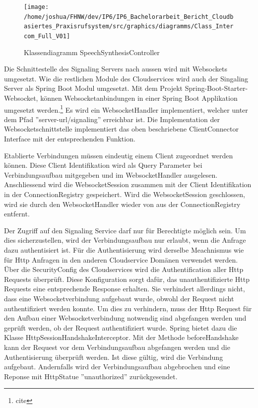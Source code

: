 \clearpage

%
%

\begin{figure}[h]
    \centering
    \begin{minipage}[b]{1\textwidth}
        \texttt{[image: /home/joshua/FHNW/dev/IP6/IP6\_Bachelorarbeit\_Bericht\_Cloudbasiertes\_Praxisrufsystem/src/graphics/diagramms/Class\_Intercom\_Full\_V01]}
        \caption{Klassendiagramm SpeechSynthesisController}
    \end{minipage}
\end{figure}

Die Schnittestelle des Signaling Servers nach aussen wird mit Websockets umgesetzt.
Wie die restlichen Module des Cloudservices wird auch der Singaling Server als Spring Boot Modul umgesetzt.
Mit dem Projekt Spring-Boot-Starter-Websocket, können Websocketanbindungen in einer Spring Boot Applikation umgesetzt werden.\footnote{cite}
Es wird ein WebsocketHandler implementiert, welcher unter dem Pfad ''server-url/signaling'' erreichbar ist.
Die Implementation der Websocketschnittstelle implementiert das oben beschriebene ClientConnector Interface mit der entsprechenden Funktion.

Etablierte Verbindungen müssen eindeutig einem Client zugeordnet werden können.
Diese Client Identifikation wird als Query Parameter bei Verbindungsaufbau mitgegeben und im WebsocketHandler ausgelesen.
Anschliessend wird die WebsocketSession zusammen mit der Client Identifikation in der ConnectionRegistry gespeichert.
Wird die WebsocketSession geschlossen, wird sie durch den WebsocketHandler wieder von aus der ConnectionRegistry entfernt.

Der Zugriff auf den Signaling Service darf nur für Berechtigte möglich sein.
Um dies sicherzustellen, wird der Verbindungsaufbau nur erlaubt, wenn die Anfrage dazu authentisiert ist.
Für die Authentisierung wird derselbe Meachnismus wie für Http Anfragen in den anderen Cloudservice Domänen verwendet werden.
Über die SecurityConfig des Cloudservices wird die Authentification aller Http Requests überprüft.
Diese Konfiguration sorgt dafür, das unauthentifizierte Http Requests eine entsprechende Response erhalten.
Sie verhindert allerdings nicht, dass eine Websocketverbindung aufgebaut wurde, obwohl der Request nicht authentifiziert werden konnte.
Um dies zu verhindern, muss der Http Request für den Aufbau einer Websocketverbindung notwendig sind abgefangen werden und geprüft werden, ob der Request authentifiziert wurde.\cite{cite}
Spring bietet dazu die Klasse HttpSessionHandshakeInterceptor.
Mit der Methode beforeHandshake kann der Request vor dem Verbindungsaufbau abgefangen werden und die Authentisierung überprüft werden.
Ist diese gültig, wird die Verbindung aufgebaut.
Andernfalls wird der Verbindungsaufbau abgebrochen und eine Reponse mit HttpStatue ''unauthorized'' zurückgesendet.

